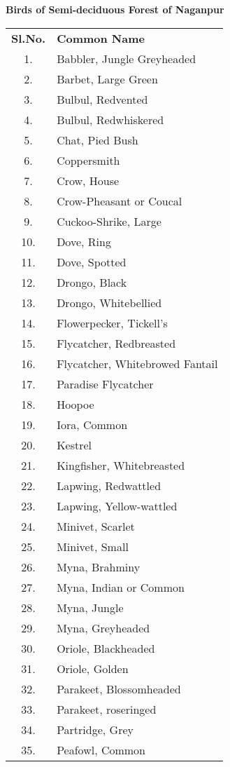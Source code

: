 \begin{center}
\smallskip
\textbf{Birds of Semi-deciduous Forest of Naganpur}
\end{center}
\begin{longtable}{cl}
\textbf{Sl.No.} & \textbf{Common Name}\\
1. & Babbler, Jungle Greyheaded \\
2. & Barbet, Large Green \\
3. & Bulbul, Redvented \\
4. & Bulbul, Redwhiskered\\ 
5. & Chat, Pied Bush \\
6. & Coppersmith \\
7. &Crow, House \\
8. &Crow-Pheasant or Coucal \\
9. &Cuckoo-Shrike, Large \\
10.& Dove, Ring \\
11.& Dove, Spotted\\ 
12.& Drongo, Black \\
13.& Drongo, Whitebellied \\
14.& Flowerpecker, Tickell's \\
15.& Flycatcher, Redbreasted \\
16.& Flycatcher, Whitebrowed Fantail \\
17.& Paradise Flycatcher \\
18.& Hoopoe \\
19.& Iora, Common \\
20.& Kestrel \\
21.& Kingfisher, Whitebreasted \\
22.& Lapwing, Redwattled \\
23.& Lapwing, Yellow-wattled \\
24.& Minivet, Scarlet \\
25.& Minivet, Small \\
26.& Myna, Brahminy \\
27.& Myna, Indian or Common \\
28.& Myna, Jungle \\
29.& Myna, Greyheaded \\
30. &Oriole, Blackheaded \\
31. &Oriole, Golden \\
32. &Parakeet, Blossomheaded \\
33. &Parakeet, roseringed \\
34. &Partridge, Grey \\
35. &Peafowl, Common \\

\end{longtable}

